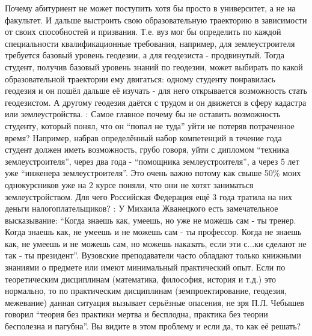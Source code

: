 \begin{drama}
Почему абитуриент не может поступить хотя бы просто в университет, а не на факультет. И дальше выстроить свою образовательную траекторию в зависимости от своих способностей и призвания. Т.е. вуз мог бы определить по каждой специальности квалификационные требования, например, для землеустроителя требуется базовый уровень геодезии, а для геодезиста - продвинутый.  Тогда студент, получив базовый уровень знаний по геодезии, может выбирать по какой образовательной траектории ему двигаться: одному студенту понравилась геодезия и он пошёл дальше её изучать - для него открывается возможность стать геодезистом. А другому геодезия даётся с трудом и он движется в сферу кадастра или землеустройства. 
	\maxspeaks: Самое главное почему бы не оставить возможность студенту, который понял, что он “попал не туда” уйти не потеряв потраченное время? Например, набрав определённый набор компетенций в течение года студент должен иметь возможность, грубо говоря, уйти с дипломом “техника землеустроителя”, через два года - “помощника землеустроителя”, а через 5 лет уже  “инженера землеустроителя”. Это очень важно потому как свыше 50\% моих однокурсников уже на 2 курсе поняли, что они не хотят заниматься землеустройством. Для чего Российская Федерация ещё 3 года тратила на них деньги налогоплательщиков?
	\maxspeaks: У Михаила Жванецкого есть замечательное высказывание: “Когда знаешь как, умеешь, но уже не можешь сам - ты тренер. Когда знаешь как, не умеешь и не можешь сам - ты профессор. Когда не знаешь как, не умеешь и не можешь сам, но можешь наказать, если эти с...ки сделают не так - ты президент”. Вузовские преподаватели часто обладают только книжными знаниями о предмете или имеют минимальный практический опыт. Если по теоретическим дисциплинам (математика, философия, история и т.д.) это нормально, то по практическим дисциплинам (земпроектирование, геодезия, межевание) данная ситуация вызывает серьёзные опасения, не зря П.Л. Чебышев говорил “теория без практики мертва и бесплодна, практика без теории бесполезна и пагубна”. Вы видите в этом проблему и если да, то как её решать?


\end{drama}
